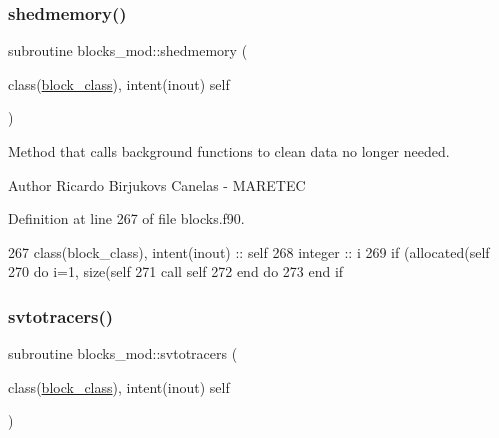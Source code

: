 \mbox{\label{namespaceblocks__mod_a04a9fab577b0d1fb6cabefcde2b2180d}} 
\subsubsection{\texorpdfstring{shedmemory()}{shedmemory()}}
{\footnotesize\ttfamily subroutine blocks\+\_\+mod\+::shedmemory (\begin{DoxyParamCaption}\item[{class(\mbox{\hyperlink{structblocks__mod_1_1block__class}{block\+\_\+class}}), intent(inout)}]{self }\end{DoxyParamCaption})\hspace{0.3cm}{\ttfamily [private]}}



Method that calls background functions to clean data no longer needed. 

\begin{DoxyAuthor}{Author}
Ricardo Birjukovs Canelas -\/ M\+A\+R\+E\+T\+EC 
\end{DoxyAuthor}


Definition at line 267 of file blocks.\+f90.


\begin{DoxyCode}
267     \textcolor{keywordtype}{class}(block\_class), \textcolor{keywordtype}{intent(inout)} :: self
268     \textcolor{keywordtype}{integer} :: i
269     \textcolor{keywordflow}{if} (\textcolor{keyword}{allocated}(self%
270         \textcolor{keywordflow}{do} i=1, \textcolor{keyword}{size}(self%
271             \textcolor{keyword}{call }self%
272 \textcolor{keywordflow}{        end do}
273 \textcolor{keywordflow}{    end if}
\end{DoxyCode}
\mbox{\label{namespaceblocks__mod_a306a753acc9b8bb9107ebda481162180}} 
\subsubsection{\texorpdfstring{svtotracers()}{svtotracers()}}
{\footnotesize\ttfamily subroutine blocks\+\_\+mod\+::svtotracers (\begin{DoxyParamCaption}\item[{class(\mbox{\hyperlink{structblocks__mod_1_1block__class}{block\+\_\+class}}), intent(inout)}]{self }\end{DoxyParamCaption})\hspace{0.3cm}{\ttfamily [private]}}




